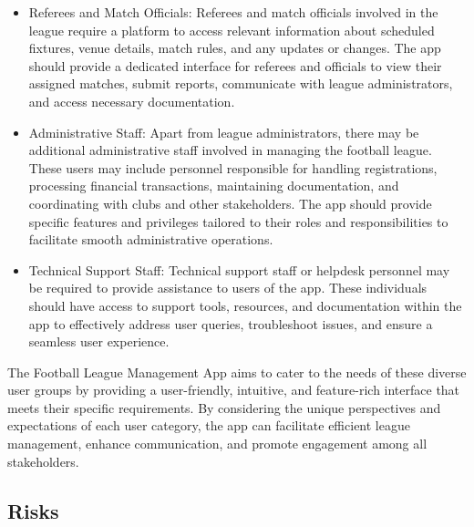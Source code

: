 \documentclass[12pt]{article}
\begin{document}
\begin{itemize}
    \item Referees and Match Officials: Referees and match officials involved in the league require a platform to access relevant information about scheduled fixtures, venue details, match rules, and any updates or changes. The app should provide a dedicated interface for referees and officials to view their assigned matches, submit reports, communicate with league administrators, and access necessary documentation.

    \item Administrative Staff: Apart from league administrators, there may be additional administrative staff involved in managing the football league. These users may include personnel responsible for handling registrations, processing financial transactions, maintaining documentation, and coordinating with clubs and other stakeholders. The app should provide specific features and privileges tailored to their roles and responsibilities to facilitate smooth administrative operations.

    \item Technical Support Staff: Technical support staff or helpdesk personnel may be required to provide assistance to users of the app. These individuals should have access to support tools, resources, and documentation within the app to effectively address user queries, troubleshoot issues, and ensure a seamless user experience.
\end{itemize}
The Football League Management App aims to cater to the needs of these diverse user groups by providing a user-friendly, intuitive, and feature-rich interface that meets their specific requirements. By considering the unique perspectives and expectations of each user category, the app can facilitate efficient league management, enhance communication, and promote engagement among all stakeholders.

\subsection{Risks}
\end{document}
